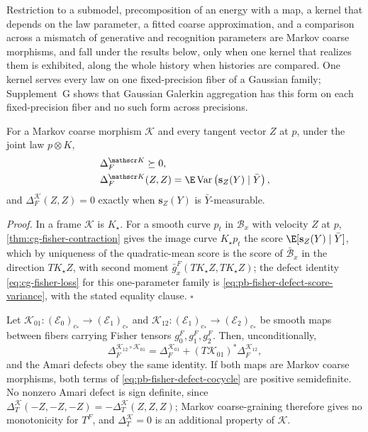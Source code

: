 Restriction to a submodel, precomposition of an energy with a map, a kernel that depends
on the law parameter, a fitted coarse approximation, and a comparison across a mismatch
of generative and recognition parameters are Markov coarse morphisms, and fall under the
results below, only when one kernel that realizes them is exhibited, along the whole history when histories are
compared.  One kernel serves every law on one fixed-precision fiber of a Gaussian
family; Supplement~G shows that Gaussian Galerkin aggregation has this form on each
fixed-precision fiber and no such form across precisions.

For a Markov coarse morphism $\mathscr K$ and every tangent vector $Z$ at $p$, under the
joint law $p\otimes K$,
\begin{align}
&\Delta_F^{\mathscr K}\succeq0,
\label{eq:pb-fisher-defect-positive}\\
&\Delta_F^{\mathscr K}(Z,Z)
=\E\operatorname{Var}\left(\mathbf s_Z(Y)\mid\bar Y\right),
\label{eq:pb-fisher-defect-score-variance}
\end{align}
and $\Delta_F^{\mathscr K}(Z,Z)=0$ exactly when $\mathbf s_Z(Y)$ is $\bar Y$-measurable.

\noindent\emph{Proof.}
In a frame $\mathscr K$ is $K_\star$.  For a smooth curve $p_t$ in $\mathcal B_x$ with
velocity $Z$ at $p$, \cref{thm:cg-fisher-contraction} gives the image curve
$K_\star p_t$ the score $\E[\mathbf s_Z(Y)\mid\bar Y]$, which by uniqueness of the
quadratic-mean score is the score of $\bar{\mathcal B}_x$ in the direction $TK_\star Z$,
with second moment $\bar g^F_x(TK_\star Z,TK_\star Z)$; the defect identity \eqref{eq:cg-fisher-loss} for this one-parameter family is
\eqref{eq:pb-fisher-defect-score-variance}, with the stated equality clause.  $\square$

Let $\mathscr K_{01}:(\mathcal E_0)_{c_*}\to(\mathcal E_1)_{c_*}$ and
$\mathscr K_{12}:(\mathcal E_1)_{c_*}\to(\mathcal E_2)_{c_*}$ be smooth maps between
fibers carrying Fisher tensors $g^F_0,g^F_1,g^F_2$.  Then, unconditionally,
\begin{equation}
\Delta_F^{\mathscr K_{12}\circ\mathscr K_{01}}
=\Delta_F^{\mathscr K_{01}}
+(T\mathscr K_{01})^*\Delta_F^{\mathscr K_{12}},
\label{eq:pb-fisher-defect-cocycle}
\end{equation}
and the Amari defects obey the same identity.  If both maps are Markov coarse morphisms,
both terms of \eqref{eq:pb-fisher-defect-cocycle} are positive semidefinite.  No nonzero
Amari defect is sign definite, since
$\Delta_T^{\mathscr K}(-Z,-Z,-Z)=-\Delta_T^{\mathscr K}(Z,Z,Z)$; Markov coarse-graining
therefore gives no monotonicity for $T^F$, and $\Delta_T^{\mathscr K}=0$ is an additional
property of $\mathscr K$.  

